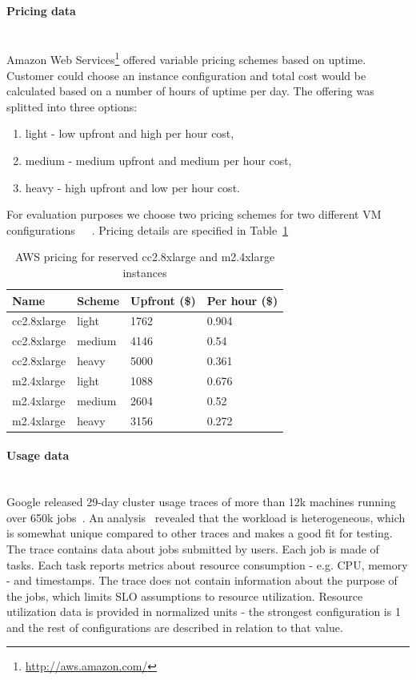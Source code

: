 \documentclass[]{final_report}
\newcommand{\myparagraph}[1]{\paragraph{#1}\mbox{}\\}
\begin{document}
\myparagraph{Pricing data}

Amazon Web Services\footnote{\url{http://aws.amazon.com/}} offered variable pricing schemes based on uptime. Customer could choose an instance configuration and total cost would be calculated based on a number of hours of uptime per day.
The offering was splitted into three options:
\begin{enumerate}
\item light - low upfront and high per hour cost,
\item medium - medium upfront and medium per hour cost,
\item heavy - high upfront and low per hour cost.
\end{enumerate}

For evaluation purposes we choose two pricing schemes for two different VM configurations~\cite{AWS:light}~\cite{AWS:medium}~\cite{AWS:heavy}. Pricing details are specified in Table~\ref{tab:aws_pricing}

\begin{table}[h]
\begin{center}
    \begin{tabular}{| l | l | l | l |}
    \hline
    \textbf{Name} & \textbf{Scheme} & \textbf{Upfront (\$)} & \textbf{Per hour (\$)} \\
    \hline
    cc2.8xlarge & light & 1762 & 0.904 \\
    \hline
    cc2.8xlarge & medium & 4146 & 0.54 \\
    \hline
    cc2.8xlarge & heavy & 5000 & 0.361 \\
    \hline
    m2.4xlarge & light & 1088 & 0.676 \\
    \hline
    m2.4xlarge & medium & 2604 & 0.52 \\
    \hline
    m2.4xlarge & heavy & 3156 & 0.272 \\
    \hline
    \end{tabular}
\end{center}
\caption{AWS pricing for reserved cc2.8xlarge and m2.4xlarge instances}
\label{tab:aws_pricing}
\end{table}

\myparagraph{Usage data}

Google released 29-day cluster usage traces of more than 12k machines running over 650k jobs~\cite{clusterdata:Reiss2011}. An analysis~\cite{clusterdata:Reiss2012b} revealed that the workload is heterogeneous, which is somewhat unique compared to other traces and makes a good fit for testing.
The trace contains data about jobs submitted by users. Each job is made of tasks. Each task reports metrics about resource consumption - e.g. CPU, memory - and timestamps. The trace does not contain information about the purpose of the jobs, which limits SLO assumptions to resource utilization. 
Resource utilization data is provided in normalized units - the strongest configuration is 1 and the rest of configurations are described in relation to that value.
\end{document}
